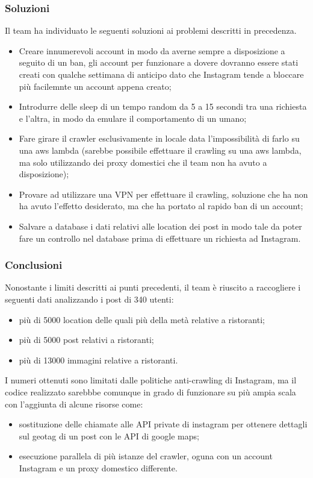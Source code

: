 \subsubsection{Soluzioni}
Il team ha individuato le seguenti soluzioni ai problemi descritti in precedenza.
\begin{itemize}
    \item Creare innumerevoli account in modo da averne sempre a disposizione a seguito di un ban, gli account per funzionare a dovere dovranno essere stati creati con qualche settimana di anticipo dato che Instagram tende a bloccare più facilemnte un account appena creato;
    \item Introdurre delle sleep di un tempo random da 5 a 15 secondi tra una richiesta e l'altra, in modo da emulare il comportamento di un umano;
    \item Fare girare il crawler esclusivamente in locale data l'impossibilità di farlo su una aws lambda (sarebbe possibile effettuare il crawling su una aws lambda, ma solo utilizzando dei proxy domestici che il team non ha avuto a disposizione);
    \item Provare ad utilizzare una VPN per effettuare il crawling, soluzione che ha non ha avuto l'effetto desiderato, ma che ha portato al rapido ban di un account;
    \item Salvare a database i dati relativi alle location dei post in modo tale da poter fare un controllo nel database prima di effettuare un richiesta ad Instagram.
\end{itemize}

\subsubsection{Conclusioni}
Nonostante i limiti descritti ai punti precedenti, il team è riuscito a raccogliere i seguenti dati analizzando i post di 340 utenti:
\begin{itemize}
    \item più di 5000 location delle quali più della metà relative a ristoranti;
    \item più di 5000 post relativi a ristoranti;
    \item più di 13000 immagini relative a ristoranti.
\end{itemize}
I numeri ottenuti sono limitati dalle politiche anti-crawling di Instagram, ma il codice realizzato sarebbbe comunque in grado di funzionare su più ampia scala con l'aggiunta di alcune risorse come:
\begin{itemize}
    \item sostituzione delle chiamate alle API private di instagram per ottenere dettagli sul geotag di un post con le API di google maps;
    \item esecuzione parallela di più istanze del crawler, oguna con un account Instagram e un proxy domestico differente.
\end{itemize}


